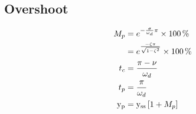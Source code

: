 \subsection*{Overshoot}
\begin{align*}
    M_p &= e^{-\frac{\sigma}{\omega_d} \pi} \times \qty{100}{\percent} \\
        &= e^{\frac{-\zeta \pi}{\sqrt{1 - \zeta^2}}} \times \qty{100}{\percent} \\
    t_c &= \frac{\pi - \nu}{\omega_d} \\
    t_p &= \frac{\pi}{\omega_d} \\
    \func{y_p} &= \func{y_{ss}} \left[1+M_p\right]
\end{align*}